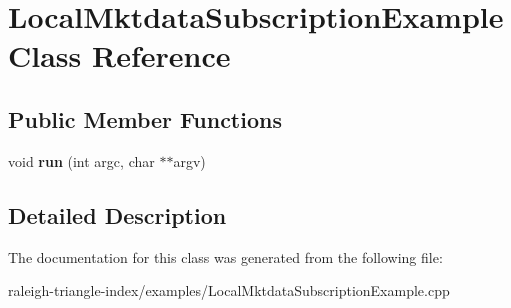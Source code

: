 \section{Local\+Mktdata\+Subscription\+Example Class Reference}
\label{class_local_mktdata_subscription_example}
\subsection*{Public Member Functions}
\begin{DoxyCompactItemize}
\item 
void {\bfseries run} (int argc, char $\ast$$\ast$argv)\label{class_local_mktdata_subscription_example_aafa79a4bf143bfebbbcec977c10235cc}

\end{DoxyCompactItemize}


\subsection{Detailed Description}


The documentation for this class was generated from the following file\+:\begin{DoxyCompactItemize}
\item 
raleigh-\/triangle-\/index/examples/Local\+Mktdata\+Subscription\+Example.\+cpp\end{DoxyCompactItemize}
